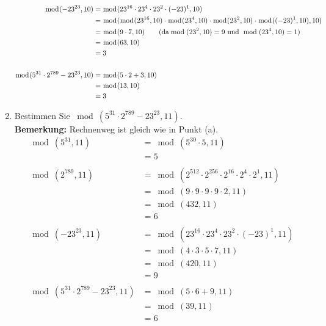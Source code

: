 \begin{enumerate}[label=(\alph*)]
\begin{align*}
			\bmod(-23^{23},10) &= \bmod(23^{16}\cdot23^{4}\cdot23^{2}\cdot(-23)^1,10) 
			\\&= \bmod(\bmod(23^{16},10)\cdot\bmod(23^{4},10)\cdot\bmod(23^{2},10)\cdot\bmod((-23)^1,10),10)
			\\&= \bmod(9\cdot 7, 10) \textrm{\qquad (da} \bmod(23^2,10)=9 \textrm{ und }\bmod(23^4,10)=1)
			\\&= \bmod(63,10) 
			\\&= 3 \\\\
			\bmod(5^{31} \cdot 2^{789}-23^{23}, 10) &= \bmod(5 \cdot 2 + 3,10)	
			\\&= \bmod(13,10) 
			\\&= 3
		\end{align*}

		\item  Bestimmen Sie $ \bmod(5^{31} \cdot 2^{789}-23^{23}, 11) $. \\
		\textbf{Bemerkung:} Rechnenweg ist gleich wie in Punkt (a).
		\begin{align*}
			\bmod(5^{31},11) &= \bmod(5^{30}\cdot5,11)
			\\&= 5 \\\\
			\bmod(2^{789},11) &= \bmod(2^{512}\cdot2^{256}\cdot2^{16}\cdot2^4\cdot2^1,11)
			\\&= \bmod(9\cdot 9\cdot 9\cdot 9\cdot 2, 11)
			\\&= \bmod(432,11)
			\\&= 6 \\\\
			\bmod(-23^{23},11) &= \bmod(23^{16}\cdot23^{4}\cdot23^{2}\cdot(-23)^1,11)
			\\&= \bmod(4\cdot 3\cdot 5\cdot 7, 11)
			\\&= \bmod(420,11)
			\\&= 9 \\\\ 
			\bmod(5^{31} \cdot 2^{789}-23^{23}, 11) &= \bmod(5 \cdot 6 + 9,11)
			\\&= \bmod(39,11)
			\\&= 6 
		\end{align*}


\end{enumerate}

